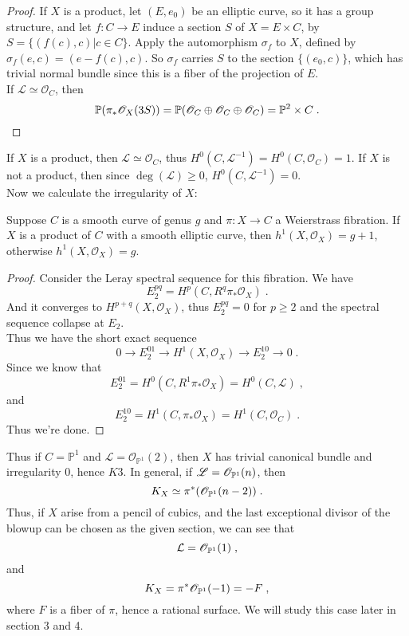 \begin{proof}
If $X$ is a product, let $(E,e_0)$ be an elliptic curve, so it has a group structure, and let $f\colon C\rightarrow E$ induce a section $S$ of $X=E\times C$, by $S=\{(f(c), c)|c\in C \}$. Apply the automorphism $\sigma_f$ to $X$, defined by $\sigma_f(e,c)=(e-f(c),c)$. So $\sigma_f$ carries $S$ to the section $\{(e_0,c)\}$, which has trivial normal bundle since this is a fiber of the projection of $E$.\\ \indent
If $\mathscr{L}\simeq \mathscr{O}_C$, then 
\[ \mathbb{P}(\pi_*\mathscr{O}_X(3S))=\mathbb{P}(\mathscr{O}_C\oplus\mathscr{O}_C\oplus\mathscr{O}_C)=\mathbb{P}^2\times C\; . \qedhere\]
\end{proof}
If $X$ is a product, then $\mathscr{L}\simeq \mathscr{O}_C$, thus $H^0(C,\mathscr{L}^{-1})=H^0(C,\mathscr{O}_C)=1$. If $X$ is not a product, then since $\deg(\mathscr{L})\geq 0$, $H^0(C,\mathscr{L}^{-1})=0$.\\ \indent
Now we calculate the irregularity of $X$:
\begin{proposition}
Suppose $C$ is a smooth curve of genus $g$ and $\pi\colon X\rightarrow C$ a Weierstrass fibration. If $X$ is a product of $C$ with a smooth elliptic curve, then $h^1(X,\mathscr{O}_X)=g+1$, otherwise $h^1(X,\mathscr{O}_X)=g$.
\end{proposition}
\begin{proof}
Consider the Leray spectral sequence for this fibration. We have \[ E^{pq}_2=H^p(C,R^q\pi_*\mathscr{O}_X)\; . \]
\indent And it converges to $H^{p+q}(X,\mathscr{O}_X)$, thus $E_2^{pq}=0$ for $p\geq 2$ and the spectral sequence collapse at $E_2$.\\ \indent
Thus we have the short exact sequence
\[ 0\rightarrow E_2^{01}\rightarrow H^1(X,\mathscr{O}_X)\rightarrow E_2^{10}\rightarrow 0\; . \]
\indent Since we know that \[ E_2^{01}=H^0(C,R^1\pi_*\mathscr{O}_X)=H^0(C,\mathscr{L})\; , \]
\indent  and
\[ E_2^{10}=H^1(C,\pi_*\mathscr{O}_X)=H^1(C,\mathscr{O}_C)\;. \]
\indent  Thus we're done.
\end{proof}
Thus if $C=\mathbb{P}^1$ and $\mathscr{L}=\mathscr{O}_{\mathbb{P}^1}(2)$, then $X$ has trivial canonical bundle and irregularity 0, hence $K3$. In general, if $\mathscr{L}=\mathscr{O}_{\mathbb{P}^1}(n)$, then \[ K_X\simeq \pi^*(\mathscr{O}_{\mathbb{P}^1}(n-2))\; . \]
\indent Thus, if $X$ arise from a pencil of cubics, and the last exceptional divisor of the blowup can be chosen as the given section, we can see that 
\[ \mathcal{L}=\mathscr{O}_{\mathbb{P}^1}(1)\; , \]
and
\[ K_X=\pi^*\mathscr{O}_{\mathbb{P}^1}(-1)=-F\; , \]
where $F$ is a fiber of $\pi$, hence a rational surface. We will study this case later in section 3 and 4.

